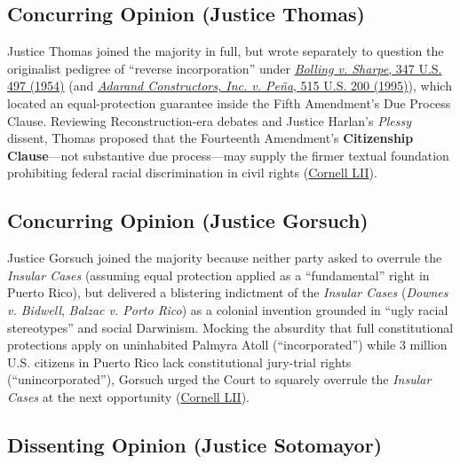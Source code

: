 \documentclass[12pt]{article}
\begin{document}
\subsection{Concurring Opinion (Justice Thomas)}

Justice Thomas joined the majority in full, but wrote separately to question the originalist pedigree of ``reverse incorporation'' under \href{https://supreme.justia.com/cases/federal/us/347/497/}{\emph{Bolling v. Sharpe}, 347 U.S. 497 (1954)} (and \href{https://supreme.justia.com/cases/federal/us/515/200/}{\emph{Adarand Constructors, Inc. v. Pe\~na}, 515 U.S. 200 (1995)}), which located an equal-protection guarantee inside the Fifth Amendment's Due Process Clause. Reviewing Reconstruction-era debates and Justice Harlan's \emph{Plessy} dissent, Thomas proposed that the Fourteenth Amendment's \textbf{Citizenship Clause}---not substantive due process---may supply the firmer textual foundation prohibiting federal racial discrimination in civil rights (\href{https://www.law.cornell.edu/supremecourt/text/20-303}{Cornell LII}).

\subsection{Concurring Opinion (Justice Gorsuch)}

Justice Gorsuch joined the majority because neither party asked to overrule the \emph{Insular Cases} (assuming equal protection applied as a ``fundamental'' right in Puerto Rico), but delivered a blistering indictment of the \emph{Insular Cases} (\emph{Downes v. Bidwell}, \emph{Balzac v. Porto Rico}) as a colonial invention grounded in ``ugly racial stereotypes'' and social Darwinism. Mocking the absurdity that full constitutional protections apply on uninhabited Palmyra Atoll (``incorporated'') while 3 million U.S. citizens in Puerto Rico lack constitutional jury-trial rights (``unincorporated''), Gorsuch urged the Court to squarely overrule the \emph{Insular Cases} at the next opportunity (\href{https://www.law.cornell.edu/supremecourt/text/20-303}{Cornell LII}).

\subsection{Dissenting Opinion (Justice Sotomayor)}
\end{document}
